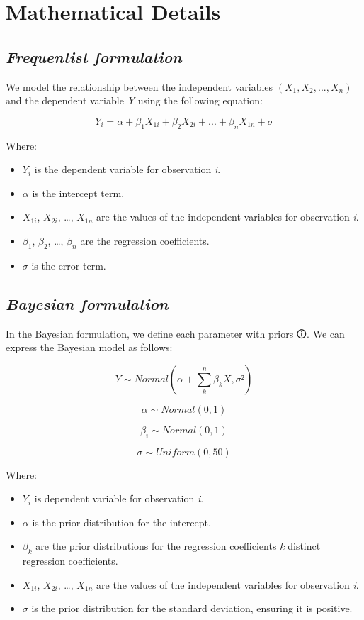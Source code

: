 \documentclass[
  letterpaper,
  DIV=11,
  numbers=noendperiod]{scrreprt}
\begin{document}
\section{Mathematical Details}\label{mathematical-details-1}

\subsection{\texorpdfstring{\emph{Frequentist
formulation}}{Frequentist formulation}}\label{frequentist-formulation-1}

We model the relationship between the independent variables
\((X_1, X_2, ..., X_n)\) and the dependent variable \emph{Y} using the
following equation:

\[
𝑌_i = \alpha +\beta_1  𝑋_{1i} + \beta_2  𝑋_{2i} + ... + \beta_n  𝑋_{1n} + \sigma
\]

Where:

\begin{itemize}
\item
  \(Y_i\) is the dependent variable for observation \emph{i}.
\item
  \(\alpha\) is the intercept term.
\item
  \(X_{1i}\), \(X_{2i}\), \ldots, \(X_{1n}\) are the values of the
  independent variables for observation \emph{i}.
\item
  \(\beta_1\), \(\beta_2\), \ldots, \(\beta_n\) are the regression
  coefficients.
\item
  \(\sigma\) is the error term.
\end{itemize}

\subsection{\texorpdfstring{\emph{Bayesian
formulation}}{Bayesian formulation}}\label{bayesian-formulation-1}

In the Bayesian formulation, we define each parameter with
\label{prior}{{priors 🛈}}. We can express the Bayesian
model as follows:

\[
𝑌 \sim Normal(\alpha + \sum_k^n  \beta_k  X, σ²)
\]

\[
\alpha \sim Normal(0,1)
\]

\[
\beta_i \sim Normal(0,1)
\]

\[
σ \sim Uniform(0, 50)
\]

Where:

\begin{itemize}
\item
  \(Y_i\) is dependent variable for observation \emph{i}.
\item
  \(\alpha\) is the prior distribution for the intercept.
\item
  \(\beta_k\) are the prior distributions for the regression
  coefficients \emph{k} distinct regression coefficients.
\item
  \(X_{1i}\), \(X_{2i}\), \ldots, \(X_{1n}\) are the values of the
  independent variables for observation \emph{i}.
\item
  \(\sigma\) is the prior distribution for the standard deviation,
  ensuring it is positive.
\end{itemize}
\end{document}
